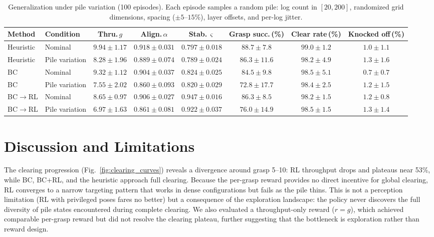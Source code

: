 \documentclass[conference]{IEEEtran}
\begin{document}
\begin{table}[t]
\centering
\caption{Generalization under pile variation (100 episodes). Each episode samples a random pile: log count in $[20, 200]$, randomized grid dimensions, spacing ($\pm 5$--$15$\%), layer offsets, and per-log jitter.}
\label{tab:robustness}
\setlength{\tabcolsep}{5pt}
\begin{tabular}{@{}llcccccc@{}}
\toprule
Method & Condition & Thru.\,$g$ & Align.\,$\alpha$ & Stab.\,$\varsigma$ & Grasp succ.\,(\%) & Clear rate\,(\%) & Knocked off\,(\%) \\
\midrule
Heuristic & Nominal        & $9.94 \pm 1.17$ & $0.918 \pm 0.031$ & $0.797 \pm 0.018$ & $88.7 \pm 7.8$  & $99.0 \pm 1.2$ & $1.0 \pm 1.1$ \\
Heuristic & Pile variation & $8.28 \pm 1.96$ & $0.889 \pm 0.074$ & $0.789 \pm 0.024$ & $86.3 \pm 11.6$ & $98.2 \pm 4.9$ & $1.3 \pm 1.6$ \\
\addlinespace
BC        & Nominal        & $9.32 \pm 1.12$ & $0.904 \pm 0.037$ & $0.824 \pm 0.025$ & $84.5 \pm 9.8$  & $98.5 \pm 5.1$ & $0.7 \pm 0.7$ \\
BC        & Pile variation & $7.55 \pm 2.02$ & $0.860 \pm 0.093$ & $0.820 \pm 0.029$ & $72.8 \pm 17.7$ & $98.4 \pm 2.5$ & $1.2 \pm 1.5$ \\
\addlinespace
BC$\to$RL & Nominal        & $8.65 \pm 0.97$ & $0.906 \pm 0.027$ & $0.947 \pm 0.016$ & $86.3 \pm 8.5$  & $98.2 \pm 1.5$ & $1.2 \pm 0.8$ \\
BC$\to$RL & Pile variation & $6.97 \pm 1.63$ & $0.861 \pm 0.081$ & $0.922 \pm 0.037$ & $76.0 \pm 14.9$ & $98.5 \pm 1.5$ & $1.3 \pm 1.4$ \\
\bottomrule
\end{tabular}
\end{table}

\section{Discussion and Limitations}

The clearing progression (Fig.~\ref{fig:clearing_curves}) reveals a divergence around grasp 5--10: RL throughput drops and plateaus near 53\%, while BC, BC+RL, and the heuristic approach full clearing.
Because the per-grasp reward provides no direct incentive for global clearing, RL converges to a narrow targeting pattern that works in dense configurations but fails as the pile thins.
This is not a perception limitation (RL with privileged poses fares no better) but a consequence of the exploration landscape: the policy never discovers the full diversity of pile states encountered during complete clearing.
We also evaluated a throughput-only reward ($r = g$), which achieved comparable per-grasp reward but did not resolve the clearing plateau, further suggesting that the bottleneck is exploration rather than reward design.
\end{document}
